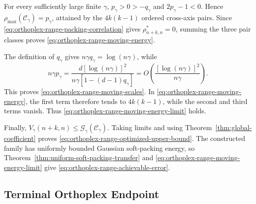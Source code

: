\documentclass[12pt,draftclsnofoot,onecolumn]{IEEEtran}
\newcommand{\cC}{\mathcal{C}}
\newcommand{\cG}{\mathcal{G}}
\theoremstyle{definition}
\begin{document}
\begin{IEEEproof}
For every sufficiently large finite \(\gamma\),
\(p_\gamma>0>-q_\gamma\) and \(2p_\gamma-1<0\).  Hence
\(\rho_{\max}(\cC_\gamma)=p_\gamma\), attained by the
\(4k(k-1)\) ordered cross-axis pairs.  Since
\eqref{eq:orthoplex-range-packing-correlation} gives
\(\rho^{\ast}_{n+k,n}=0\), summing the three pair classes proves
\eqref{eq:orthoplex-range-moving-energy}.

The definition of \(q_\gamma\) gives
\(n\gamma q_\gamma=\log(n\gamma)\), while
\[
  n\gamma p_\gamma
  =
  \frac{d[\log(n\gamma)]^2}
  {n\gamma[1-(d-1)q_\gamma]}
  =
  O\left(\frac{[\log(n\gamma)]^2}{n\gamma}\right).
\]
This proves \eqref{eq:orthoplex-range-moving-scales}.  In
\eqref{eq:orthoplex-range-moving-energy}, the first term therefore
tends to \(4k(k-1)\), while the second and third terms vanish.  Thus
\eqref{eq:orthoplex-range-moving-energy-limit} holds.

Finally,
\(V_\gamma(n+k,n)\le\cG_\gamma(\cC_\gamma)\).  Taking limits and using
Theorem~\ref{thm:global-coefficient} proves
\eqref{eq:orthoplex-range-optimized-upper-bound}.  The constructed
family has uniformly bounded Gaussian soft-packing energy, so
Theorem~\ref{thm:uniform-soft-packing-transfer} and
\eqref{eq:orthoplex-range-moving-energy-limit} give
\eqref{eq:orthoplex-range-achievable-error}.
\end{IEEEproof}

\subsection{Terminal Orthoplex Endpoint}
\end{document}
